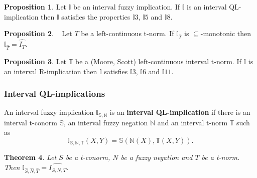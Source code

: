 \documentclass[conference]{IEEEtran}
\theoremstyle{plain}
\newtheorem{theorem}{Theorem}[section]
\theoremstyle{remark}
\theoremstyle{definition}
\theoremstyle{proposition}
\newtheorem{proposition}[theorem]{Proposition}
\newcommand{\II}{\mathbb{I} }
\newcommand{\UU}{\mathbb{U} }
\newcommand{\NN}{\mathbb{N} }
\newcommand{\TT}{\mathbb{T} }
\newcommand{\Ss}{\mathbb{S} }
\newcommand{\prova}[1]{\noindent\textbf{Proof:} #1\hfill
{\small $\blacktriangle$}\\}
\begin{document}
\begin{proposition}\label{pro-int-QLimp-prop}
Let $\II$ be an interval fuzzy implication. If $\II$ is an
interval QL-implication then $\II$ satisfies the properties $\II3$, $\II5$ and $\II8$.
\end{proposition}


\begin{proposition}~\cite[Theorem 24]{BDR09}
Let $T$ be a left-continuous t-norm. If $\II_{\widehat{T}}$ is $\subseteq$-monotonic then
$\II_{\widehat{T}}=\widehat{I_{T}}$.
\end{proposition}

\begin{proposition}\cite[Theorem 14]{BDR09}\label{pn}
Let $\mathbb{T}$ be a (Moore, Scott) left-continuous interval t-norm. If $\II$ is an
interval R-implication then $\II$ satisfies $\II3$, $\II6$ and $\II11$.
\end{proposition}

\subsubsection{Interval QL-implications}\label{subclass-int-ql}

An interval fuzzy implication $\II_{\Ss,\NN}$ is an
\textbf{interval QL-implication} if there is an interval t-conorm
$\Ss$, an interval fuzzy negation $\NN$ and an interval t-norm
$\TT$ such as
\begin{equation}\label{eq-Int-QL-imp}
\II_{\Ss,\NN,\mathbb{T}}(X,Y)=\Ss(\NN(X),\TT(X,Y)).
\end{equation}

\begin{theorem}\label{teo-QL-imp-BIR}
Let $S$ be a t-conorm, $N$ be a fuzzy negation and $T$ be a
t-norm. Then
$\II_{\widehat{S},\widehat{N},\widehat{T}}=\widehat{I_{S,N,T}}$.
\end{theorem}


\end{document}

